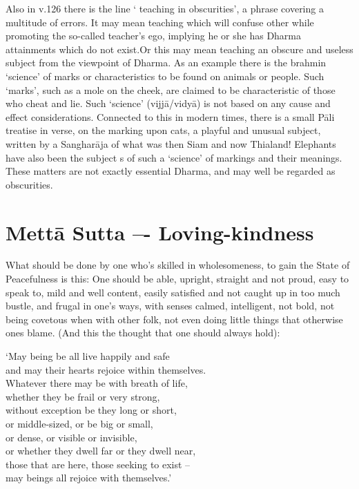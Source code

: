 Also in v.126 there is the line ` teaching in obscurities', a phrase covering a multitude of errors. It may mean teaching which will confuse other while promoting the so-called teacher's ego, implying he or she has Dharma attainments which do not exist.Or this may mean teaching an obscure and useless subject from the viewpoint of Dharma. As an example there is the brahmin `science' of marks or characteristics to be found on animals or people. Such `marks', such as a mole on the cheek, are claimed to be characteristic of those who cheat and lie. Such `science' (vijj\=a/vidy\=a) is not based on any cause and effect considerations. Connected to this in modern times, there is a small P\=ali treatise in verse, on the marking upon cats, a playful and unusual subject, written by a Sanghar\=aja of what was then Siam and now Thialand!
Elephants have also been the subject s of such a `science' of markings and their meanings. These matters are not exactly essential Dharma, and may well be regarded as obscurities.

\chapter{Mett\=a Sutta –- Loving-kindness}
What should be done by one who's skilled in wholesomeness, to gain the State of Peacefulness is this:
One should be able, upright, straight and not proud,
easy to speak to, mild and well content,
easily satisfied and not caught up 
in too much bustle, and frugal in one's ways,
with senses calmed, intelligent, not bold,
not being covetous when with other folk,
not even doing little things that otherwise ones blame. (And this the thought that one should always hold):
\begin{MyDescription}[]{}
\end{MyDescription}      

\begin{MyDescription}{}
`May being be all live happily and safe\\
and may their hearts rejoice within themselves.\\
Whatever there may be with breath of life,\\
whether they be frail or very strong,\\
without exception be they long or short,\\
or middle-sized, or be big or small,\\
or dense, or visible or invisible,\\
or whether they dwell far or they dwell near,\\
those that are here, those seeking to exist – \\
may beings all rejoice with themselves.'
\end{MyDescription}   
   
